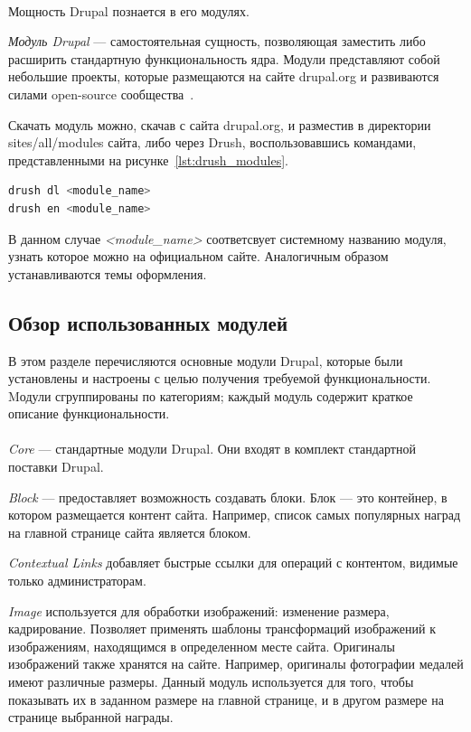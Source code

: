 \paragraph{}
Мощность Drupal познается в его модулях. 

\textit{Модуль Drupal} --- самостоятельная сущность, позволяющая заместить либо
расширить стандартную функциональность ядра. 
Модули представляют собой небольшие проекты, которые размещаются на сайте
drupal.org и развиваются силами open-source сообщества~\cite{drupal_modules}.

Скачать модуль можно, скачав с сайта drupal.org, и разместив в директории
sites/all/modules сайта, либо через Drush, воспользовавшись командами,
представленными на рисунке~\ref{lst:drush_modules}.

\begin{lstlisting}[language=bash,
  caption=Установка модуля Drupal с использованием Drush,
  label=lst:drush_modules]
drush dl <module_name>
drush en <module_name>
\end{lstlisting}

В данном случае \textit{<module\_name>} соответсвует системному названию модуля,
узнать которое можно на официальном сайте.
Аналогичным образом устанавливаются темы оформления.

\subsection{Обзор использованных модулей}
\label{ssec:modules_overlook}

В этом разделе перечисляются основные модули Drupal,
которые были установлены и настроены с целью получения требуемой функциональности.
Mодули сгруппированы по категориям; каждый модуль содержит краткое описание функциональности.

\paragraph{}
\textit{Core} --- стандартные модули Drupal. Они входят в комплект стандартной поставки Drupal.

\textit{Block} --- предоставляет возможность создавать блоки. 
Блок --- это контейнер, в котором размещается контент сайта.
Например, список самых популярных наград на главной странице сайта является блоком.

\textit{Contextual Links} добавляет быстрые ссылки для операций с контентом,
видимые только администраторам.

\textit{Image} используется для обработки изображений: изменение размера, кадрирование.
Позволяет применять шаблоны трансформаций изображений к изображениям,
находящимся в определенном месте сайта. Оригиналы изображений также хранятся на сайте.
Например, оригиналы фотографии медалей имеют различные размеры. 
Данный модуль используется для того, чтобы показывать их в заданном размере
на главной странице, и в другом размере на странице выбранной награды.

